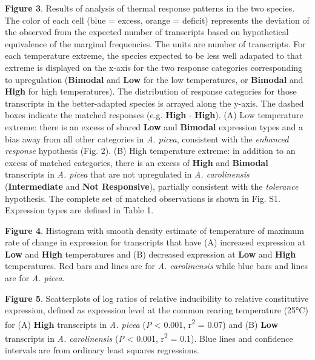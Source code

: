 \documentclass[]{article}
\begin{document}
\textbf{Figure 3}. Results of analysis of thermal response patterns in
the two species. The color of each cell (blue = excess, orange =
deficit) represents the deviation of the observed from the expected
number of transcripts based on hypothetical equivalence of the marginal
frequencies. The units are number of transcripts. For each temperature
extreme, the species expected to be less well adapated to that extreme
is displayed on the x-axis for the two response categories corresponding
to upregulation (\textbf{Bimodal} and \textbf{Low} for the low
temperatures, or \textbf{Bimodal} and \textbf{High} for high
temperatures). The distribution of response categories for those
transcripts in the better-adapted species is arrayed along the y-axis.
The dashed boxes indicate the matched responses (e.g. \textbf{High} -
\textbf{High}). (A) Low temperature extreme: there is an excess of
shared \textbf{Low} and \textbf{Bimodal} expression types and a bias
away from all other categories in \emph{A. picea}, consistent with the
\emph{enhanced response} hypothesis (Fig. 2). (B) High temperature
extreme: in addition to an excess of matched categories, there is an
excess of \textbf{High} and \textbf{Bimodal} transcripts in \emph{A.
picea} that are not upregulated in \emph{A. carolinensis}
(\textbf{Intermediate} and \textbf{Not Responsive}), partially
consistent with the \emph{tolerance} hypothesis. The complete set of
matched observations is shown in Fig. S1. Expression types are defined
in Table 1.

\textbf{Figure 4}. Histogram with smooth density estimate of temperature
of maximum rate of change in expression for transcripts that have (A)
increased expression at \textbf{Low} and \textbf{High} temperatures and
(B) decreased expression at \textbf{Low} and \textbf{High} temperatures.
Red bars and lines are for \emph{A. carolinensis} while blue bars and
lines are for \emph{A. picea}.

\textbf{Figure 5}. Scatterplots of log ratios of relative inducibility
to relative constitutive expression, defined as expression level at the
common rearing temperature (25°C) for (A) \textbf{High} transcripts in
\emph{A. picea} (\emph{P} \textless{} 0.001, r\textsuperscript{2} =
0.07) and (B) \textbf{Low} transcripts in \emph{A. carolinensis}
(\emph{P} \textless{} 0.001, r\textsuperscript{2} = 0.1). Blue lines and
confidence intervals are from ordinary least squares regressions.
\end{document}
